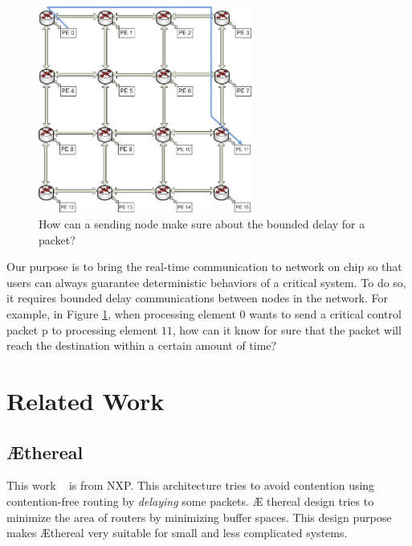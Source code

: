\documentclass[conference, twocolumn]{IEEEtran}
\theoremstyle{definition}
\begin{document}
\begin{figure}[htp]
\centering
\includegraphics[width=7cm]{pics/NoC0}
\caption[Demand for a hard real-time flow.]
{How can a sending node make sure about the bounded delay for
a packet?}\label{fig:NoCRt}
\end{figure}

Our purpose is to bring the real-time communication to network on chip so that 
users can always guarantee deterministic behaviors of a critical system. To do 
so, it requires bounded delay communications between nodes in the network. 
For example, in Figure \ref{fig:NoCRt}, when processing element $0$ wants
to send a critical control packet p to processing element $11$, how can it know
for sure that the packet will reach the destination within a certain amount of time? 


\section{Related Work}
\subsection{\AE thereal}
This work ~\cite{Goossens_chapter4} is from NXP. This architecture tries to
avoid contention using contention-free routing by {\em delaying} some packets. \AE
thereal design tries to minimize the area of routers by minimizing buffer
spaces. This design purpose makes \AE thereal very suitable for small and less
complicated systems.
\end{document}
